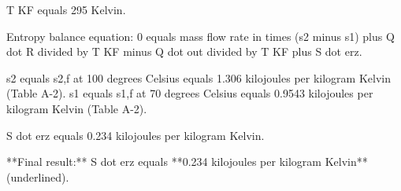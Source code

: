 T KF equals 295 Kelvin.  

Entropy balance equation:  
0 equals mass flow rate in times (s2 minus s1) plus Q dot R divided by T KF minus Q dot out divided by T KF plus S dot erz.  

s2 equals s2,f at 100 degrees Celsius equals 1.306 kilojoules per kilogram Kelvin (Table A-2).  
s1 equals s1,f at 70 degrees Celsius equals 0.9543 kilojoules per kilogram Kelvin (Table A-2).  

S dot erz equals 0.234 kilojoules per kilogram Kelvin.  

**Final result:** S dot erz equals **0.234 kilojoules per kilogram Kelvin** (underlined).